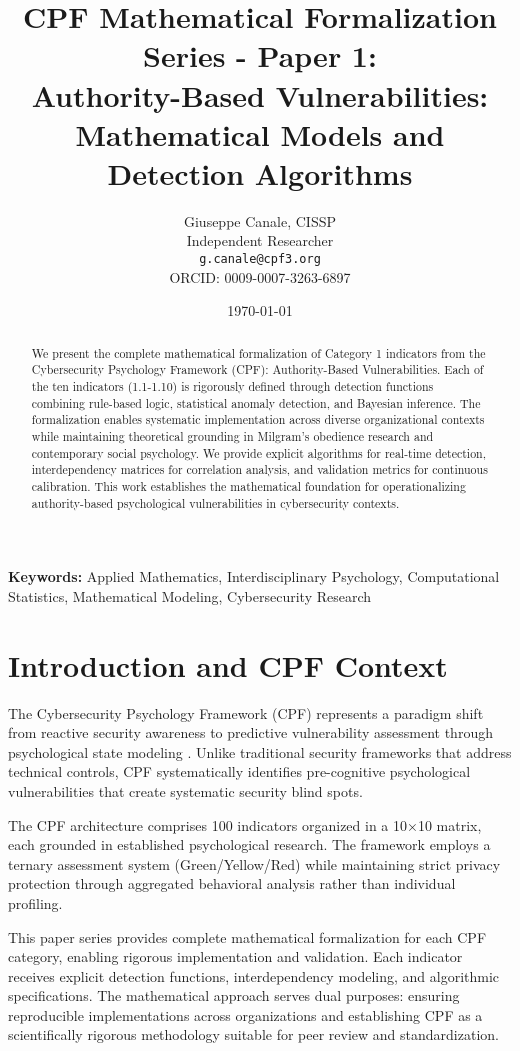 \documentclass[11pt,a4paper]{article}
\title{CPF Mathematical Formalization Series - Paper 1:\\Authority-Based Vulnerabilities: Mathematical Models and Detection Algorithms}
\author{
    Giuseppe Canale, CISSP\\
    Independent Researcher\\
    \texttt{g.canale@cpf3.org}\\
    ORCID: 0009-0007-3263-6897
}
\date{\today}
\begin{document}
\maketitle

\begin{abstract}
We present the complete mathematical formalization of Category 1 indicators from the Cybersecurity Psychology Framework (CPF): Authority-Based Vulnerabilities. Each of the ten indicators (1.1-1.10) is rigorously defined through detection functions combining rule-based logic, statistical anomaly detection, and Bayesian inference. The formalization enables systematic implementation across diverse organizational contexts while maintaining theoretical grounding in Milgram's obedience research and contemporary social psychology. We provide explicit algorithms for real-time detection, interdependency matrices for correlation analysis, and validation metrics for continuous calibration. This work establishes the mathematical foundation for operationalizing authority-based psychological vulnerabilities in cybersecurity contexts.
\end{abstract}

\textbf{Keywords:} Applied Mathematics, Interdisciplinary Psychology, Computational Statistics, Mathematical Modeling, Cybersecurity Research

\section{Introduction and CPF Context}

The Cybersecurity Psychology Framework (CPF) represents a paradigm shift from reactive security awareness to predictive vulnerability assessment through psychological state modeling \cite{canale2024cpf}. Unlike traditional security frameworks that address technical controls, CPF systematically identifies pre-cognitive psychological vulnerabilities that create systematic security blind spots.

The CPF architecture comprises 100 indicators organized in a 10×10 matrix, each grounded in established psychological research. The framework employs a ternary assessment system (Green/Yellow/Red) while maintaining strict privacy protection through aggregated behavioral analysis rather than individual profiling.

This paper series provides complete mathematical formalization for each CPF category, enabling rigorous implementation and validation. Each indicator receives explicit detection functions, interdependency modeling, and algorithmic specifications. The mathematical approach serves dual purposes: ensuring reproducible implementations across organizations and establishing CPF as a scientifically rigorous methodology suitable for peer review and standardization.
\end{document}
